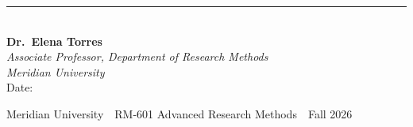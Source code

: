 \documentclass[11pt,a4paper]{article}
\begin{document}
\begin{tcolorbox}[
  colback=white,
  colframe=accent!50,
  sharp corners,
  boxrule=0.6pt,
  left=10pt, right=10pt, top=10pt, bottom=10pt,
  title={\small\bfseries\textcolor{primary}{\faComment\ \ Instructor Comments}},
  fonttitle=\bfseries\small,
  coltitle=primary
]
  \vspace{4.5cm}
  \begin{flushright}
    \rule{5.5cm}{0.4pt}\\[4pt]
    \small\textbf{Dr.\ Elena Torres}\\[2pt]
    \small\textit{Associate Professor, Department of Research Methods}\\[2pt]
    \small\textit{Meridian University}\\[6pt]
    \small\textcolor{accent!70}{Date:\ \ \phantom{xxxxxxxxxxxxxxx}}
  \end{flushright}
\end{tcolorbox}

\vfill
\begin{center}
  \footnotesize\textcolor{primary!40}{Meridian University\ \textbar\ RM-601 Advanced Research Methods\ \textbar\ Fall 2026}
\end{center}
\end{document}
